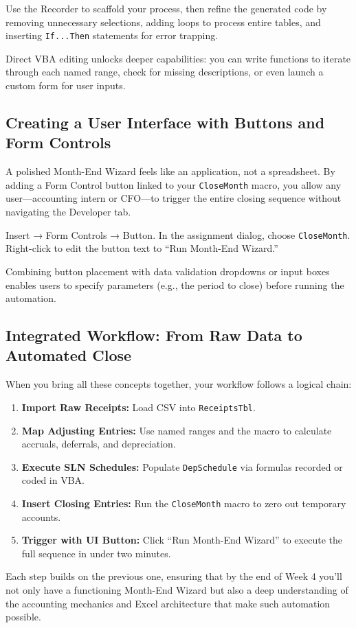 \begin{Important}
Use the Recorder to scaffold your process, then refine the generated code by removing unnecessary selections, adding loops to process entire tables, and inserting \verb|If...Then| statements for error trapping.
\end{Important}

Direct VBA editing unlocks deeper capabilities: you can write functions to iterate through each named range, check for missing descriptions, or even launch a custom form for user inputs.

\subsection{Creating a User Interface with Buttons and Form Controls}
A polished Month-End Wizard feels like an application, not a spreadsheet. By adding a Form Control button linked to your \texttt{CloseMonth} macro, you allow any user—accounting intern or CFO—to trigger the entire closing sequence without navigating the Developer tab.

\begin{Example}
Insert → Form Controls → Button. In the assignment dialog, choose \texttt{CloseMonth}. Right-click to edit the button text to “Run Month-End Wizard.”
\end{Example}

Combining button placement with data validation dropdowns or input boxes enables users to specify parameters (e.g., the period to close) before running the automation.

\subsection{Integrated Workflow: From Raw Data to Automated Close}
When you bring all these concepts together, your workflow follows a logical chain:

\begin{enumerate}
  \item \textbf{Import Raw Receipts:} Load CSV into \texttt{ReceiptsTbl}.  
  \item \textbf{Map Adjusting Entries:} Use named ranges and the macro to calculate accruals, deferrals, and depreciation.  
  \item \textbf{Execute SLN Schedules:} Populate \texttt{DepSchedule} via formulas recorded or coded in VBA.  
  \item \textbf{Insert Closing Entries:} Run the \texttt{CloseMonth} macro to zero out temporary accounts.  
  \item \textbf{Trigger with UI Button:} Click “Run Month-End Wizard” to execute the full sequence in under two minutes.
\end{enumerate}

Each step builds on the previous one, ensuring that by the end of Week 4 you’ll not only have a functioning Month-End Wizard but also a deep understanding of the accounting mechanics and Excel architecture that make such automation possible.

\clearpage
